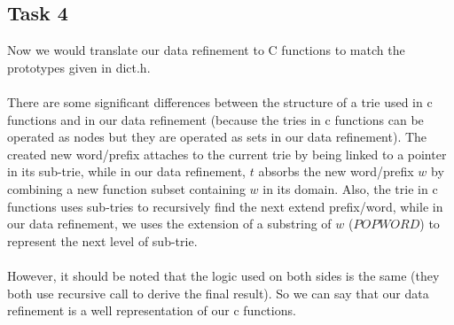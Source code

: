 \documentclass[a4paper,12pt,fleqn]{scrartcl}
\begin{document}
\subsection{Task 4}
Now we would translate our data refinement to C functions to match the
prototypes given in dict.h. \\\\
There are some significant differences between the structure of a trie used in c 
functions and in our data refinement (because the tries in c functions can be 
operated as nodes but they are operated as sets in our data refinement). The 
created new word/prefix attaches to the current trie by being linked to a pointer 
in its sub-trie, while in our data refinement, $t$ absorbs the new word/prefix 
$w$ by combining a new function subset containing $w$ in its domain. Also, the 
trie in c functions uses sub-tries to recursively find the next extend prefix/word,
while in our data refinement, we uses the extension of a substring of $w$ ($POPWORD$)
to represent the next level of sub-trie.\\\\
However, it should be noted that the logic used on both sides is the same (they 
both use recursive call to derive the final result). So we can say that our data 
refinement is a well representation of our c functions.

\end{document}
